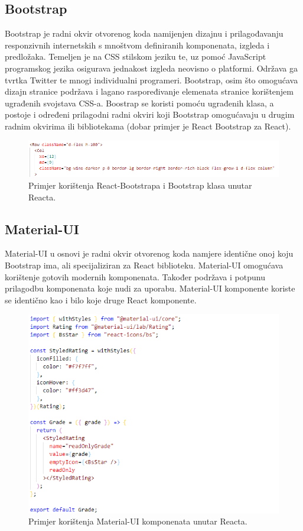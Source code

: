 \documentclass[times, utf8, zavrsni]{fer}
\begin{document}
		\subsection{Bootstrap}
		Bootstrap je radni okvir otvorenog koda namijenjen dizajnu i prilagođavanju responzivnih internetskih s mnoštvom definiranih komponenata, izgleda i predložaka. Temeljen je na CSS stilskom jeziku te, uz pomoć JavaScript programskog jezika osigurava jednakost izgleda neovisno o platformi. Održava ga tvrtka Twitter te mnogi individualni programeri. Bootstrap, osim što omogućava dizajn stranice podržava i lagano raspoređivanje elemenata stranice korištenjem ugrađenih svojstava CSS-a. Boostrap se koristi pomoću ugrađenih klasa, a postoje i određeni prilagodni radni okviri koji Bootstrap omogućavaju u drugim radnim okvirima ili bibliotekama (dobar primjer je React Bootstrap za React).
		\begin{figure}[H]
			\centering
			\includegraphics[width=\linewidth]{pictures/prikazi/Bootstrap.png}
			\caption{Primjer korištenja React-Bootstrapa i Bootstrap klasa unutar Reacta.}
			\label{fig:bootstrap}
		\end{figure}
		
		\subsection{Material-UI}
		Material-UI u osnovi je radni okvir otvorenog koda namjere identične onoj koju Bootstrap ima, ali specijaliziran za React biblioteku. Material-UI omogućava korištenje gotovih modernih komponenata. Također podržava i potpunu prilagodbu komponenata koje nudi za uporabu. Material-UI komponente koriste se identično kao i bilo koje druge React komponente.
		\begin{figure}[H]
			\centering
			\includegraphics[width=\linewidth]{pictures/prikazi/MaterialUI.png}
			\caption{Primjer korištenja Material-UI komponenata unutar Reacta.}
			\label{fig:materialUI}
		\end{figure}
		
\end{document}
